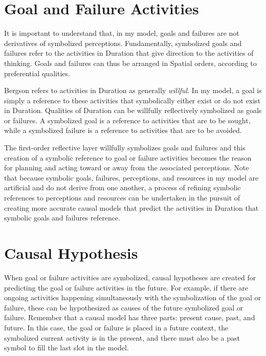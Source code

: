 \section{Goal and Failure Activities}

It is important to understand that, in my model, goals and failures
are not derivatives of symbolized perceptions.  Fundamentally,
symbolized goals and failures refer to the activities in Duration that
give direction to the activities of thinking.  Goals and failures can
thus be arranged in Spatial orders, according to preferential
qualities.

Bergson refers to activities in Duration as generally \emph{willful}.
In my model, a goal is simply a reference to these activities that
symbolically either exist or do not exist in Duration.  Qualities of
Duration can be willfully reflectively symbolized as goals or
failures.  A symbolized goal is a reference to activities that are to
be sought, while a symbolized failure is a reference to activities
that are to be avoided.

The first-order reflective layer willfully symbolizes goals and
failures and this creation of a symbolic reference to goal or failure
activities becomes the reason for planning and acting toward or away
from the associated perceptions.  Note that because symbolic goals,
failures, perceptions, and resources in my model are artificial and do
not derive from one another, a process of refining symbolic references
to perceptions and resources can be undertaken in the pursuit of
creating more accurate causal models that predict the activities in
Duration that symbolic goals and failures reference.

\section{Causal Hypothesis}

When goal or failure activities are symbolized, causal hypotheses are
created for predicting the goal or failure activities in the future.
For example, if there are ongoing activities happening simultaneously
with the symbolization of the goal or failure, these can be
hypothesized as causes of the future symbolized goal or failure.
Remember that a causal model has three parts: present cause, past, and
future.  In this case, the goal or failure is placed in a future
context, the symbolized current activity is in the present, and there
must also be a past symbol to fill the last slot in the model.

